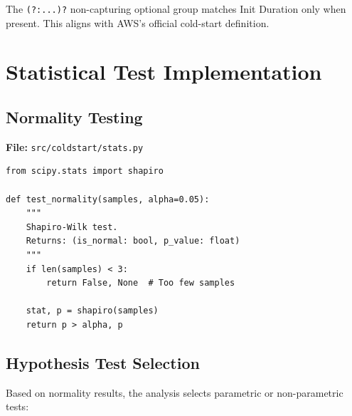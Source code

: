 The \texttt{(?:...)?} non-capturing optional group matches Init Duration only when present. This aligns with AWS's official cold-start definition.

\section{Statistical Test Implementation}

\subsection{Normality Testing}

\textbf{File:} \texttt{src/coldstart/stats.py}

\begin{verbatim}
from scipy.stats import shapiro

def test_normality(samples, alpha=0.05):
    """
    Shapiro-Wilk test.
    Returns: (is_normal: bool, p_value: float)
    """
    if len(samples) < 3:
        return False, None  # Too few samples
    
    stat, p = shapiro(samples)
    return p > alpha, p
\end{verbatim}

\subsection{Hypothesis Test Selection}

Based on normality results, the analysis selects parametric or non-parametric tests:

